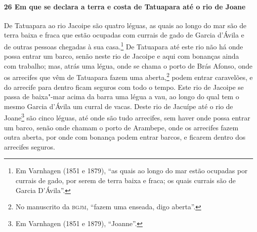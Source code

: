 \begin{linenumbers}
\paragraph{26 Em que se declara a terra e costa de Tatuapara até o rio de Joane} \quad
De Tatuapara ao rio Jacoipe são quatro léguas, as quais ao longo do mar são de terra baixa
e fraca que estão ocupadas com currais de gado de Garcia d'Ávila e de outras pessoas
chegadas à sua casa.\footnote{ Em Varnhagen (1851 e 1879), ``as quais ao longo do mar
estão ocupadas por currais de gado, por serem de terra baixa e fraca; os quais currais são
de Garcia D'Ávila''.} De Tatuapara até este rio não há onde possa entrar um barco, senão
neste rio de Jacoipe e aqui com bonanças ainda com trabalho; mas, atrás uma légua, onde se
chama o porto de Brás Afonso, onde os arrecifes que vêm de Tatuapara fazem uma
aberta,\footnote{ No manuscrito da \textsc{bgjm}, ``fazem uma enseada, digo aberta''.}
podem entrar caravelões, e do arrecife para dentro ficam seguros com todo o tempo. Este
rio de Jacoipe se passa de baixa"-mar acima da barra uma légua a vau, ao longo do qual tem
o mesmo Garcia d'Ávila um curral de vacas. Deste rio de Jacuípe até o rio de
Joane\footnote{ Em Varnhagen (1851 e 1879), ``Joanne''.} são cinco léguas, até onde são
tudo arrecifes, sem haver onde possa entrar um barco, senão onde chamam o porto de
Arambepe, onde os arrecifes fazem outra aberta, por onde com bonança podem entrar barcos,
e ficarem dentro dos arrecifes seguros.


\end{linenumbers}
